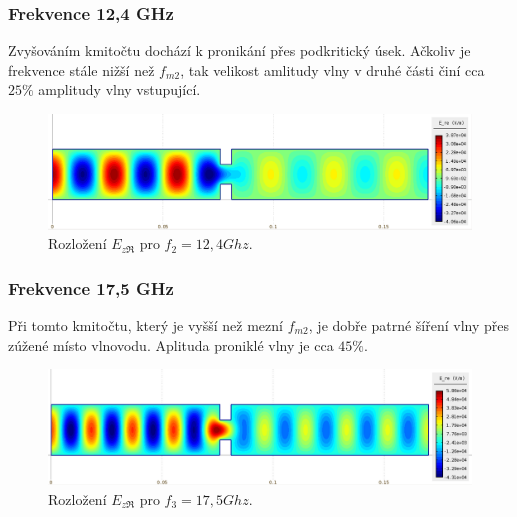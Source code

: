 \newpage
\subsubsection*{Frekvence 12,4 GHz}
Zvyšováním kmitočtu dochází k pronikání přes podkritický úsek. Ačkoliv je frekvence stále nižší než $f_{m2}$, tak velikost amlitudy vlny v druhé části činí cca $25 \%$ amplitudy vlny vstupující.
\begin{figure}[!h]
	\centering
	\includegraphics[width=15cm]{priklad_R100narrow_Ere_12Ghz.png}
	\caption{Rozložení $E_{z\Re}$ pro $f_2 = 12,4\unit{Ghz}$.}
	\label{obr:priklad_R100narrow_Ere_12Ghz}
\end{figure}

\subsubsection*{Frekvence 17,5 GHz}
Při tomto kmitočtu, který je vyšší než mezní $f_{m2}$, je dobře patrné šíření vlny přes zúžené místo vlnovodu. Aplituda proniklé vlny je cca $45 \%$.
\begin{figure}[!h]
	\centering
	\includegraphics[width=15cm]{priklad_R100narrow_Ere_17Ghz.png}
	\caption{Rozložení $E_{z\Re}$ pro $f_3 = 17,5\unit{Ghz}$.}
	\label{obr:priklad_R100narrow_Ere_17Ghz}
\end{figure}

\newpage
